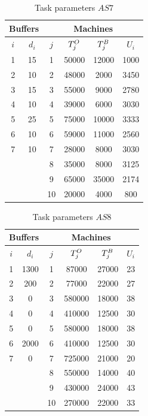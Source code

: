 \documentclass{ifacconf}
\begin{document}
\begin{table}[h!]
	\centering
	\small
	\begin{tabular}{||c|c||c|c|c|c||}
		\hline \hline
		\multicolumn{2}{||c||}{Buffers}&\multicolumn{4}{|c||}{Machines}\\
		\hline
		$i$ & $d_i$ & $j$  & $T^{\rm O}_j$ & $T^{\rm B}_j$ & $U_i$ \\
		\hline
		1 & 15 & 1 & 50000 & 12000 & 1000\\
		2 & 10 & 2 & 48000 & 2000 & 3450\\
		3 & 15 & 3 & 55000 & 9000 & 2780 \\
		4 & 10 & 4 & 39000 & 6000 & 3030\\
		5 &  25  & 5 & 75000 & 10000 & 3333\\
		6 &  10 & 6 & 59000 & 11000 & 2560\\
		7 & 10 & 7 & 28000 & 8000 & 3030\\
			&  & 8 & 35000 & 8000 & 3125\\
			&  & 9 & 65000 &  35000 & 2174\\
			&  & 10 & 20000 & 4000 & 800\\
		\hline \hline
	\end{tabular}
	\caption{Task parameters $\textit{AS7}$} \label{tabl:as7}
\end{table}
\begin{table}[h!]
	\centering
	\small
	\begin{tabular}{||c|c||c|c|c|c||}
		\hline \hline
		\multicolumn{2}{||c||}{Buffers}&\multicolumn{4}{|c||}{Machines}\\
		\hline
		$i$ & $d_i$ & $j$  & $T^{\rm O}_j$ & $T^{\rm B}_j$ & $U_i$ \\
		\hline
		1 & 1300 & 1 & 87000 & 27000 & 23\\
		2 & 200 & 2 & 77000 & 22000 & 27\\
		3 & 0 & 3 & 580000 & 18000 & 38\\
		4 & 0 & 4 & 410000 & 12500 & 30\\
		5 & 0 & 5 & 580000 & 18000 & 38\\
		6 & 2000 & 6 & 410000 & 12500 & 30\\
		7 & 0 & 7 & 725000 & 21000 & 20\\
		  &  & 8 & 550000 & 14000 & 40\\
		 &  & 9 & 430000 & 24000 & 43\\
		   &  & 10 & 270000 & 22000 & 33\\
		\hline \hline
	\end{tabular}
	\caption{Task parameters $\textit{AS8}$} \label{tabl:as8}
\end{table}
\end{document}
